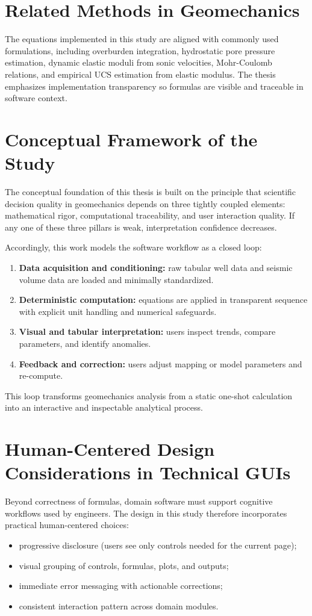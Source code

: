 \documentclass[12pt,a4paper]{report}
\begin{document}
\section{Related Methods in Geomechanics}
The equations implemented in this study are aligned with commonly used formulations, including overburden integration, hydrostatic pore pressure estimation, dynamic elastic moduli from sonic velocities, Mohr-Coulomb relations, and empirical UCS estimation from elastic modulus. The thesis emphasizes implementation transparency so formulas are visible and traceable in software context.

\section{Conceptual Framework of the Study}
The conceptual foundation of this thesis is built on the principle that scientific decision quality in geomechanics depends on three tightly coupled elements: mathematical rigor, computational traceability, and user interaction quality. If any one of these three pillars is weak, interpretation confidence decreases.

Accordingly, this work models the software workflow as a closed loop:
\begin{enumerate}
    \item \textbf{Data acquisition and conditioning:} raw tabular well data and seismic volume data are loaded and minimally standardized.
    \item \textbf{Deterministic computation:} equations are applied in transparent sequence with explicit unit handling and numerical safeguards.
    \item \textbf{Visual and tabular interpretation:} users inspect trends, compare parameters, and identify anomalies.
    \item \textbf{Feedback and correction:} users adjust mapping or model parameters and re-compute.
\end{enumerate}

This loop transforms geomechanics analysis from a static one-shot calculation into an interactive and inspectable analytical process.

\section{Human-Centered Design Considerations in Technical GUIs}
Beyond correctness of formulas, domain software must support cognitive workflows used by engineers. The design in this study therefore incorporates practical human-centered choices:
\begin{itemize}
    \item progressive disclosure (users see only controls needed for the current page);
    \item visual grouping of controls, formulas, plots, and outputs;
    \item immediate error messaging with actionable corrections;
    \item consistent interaction pattern across domain modules.
\end{itemize}
\end{document}

